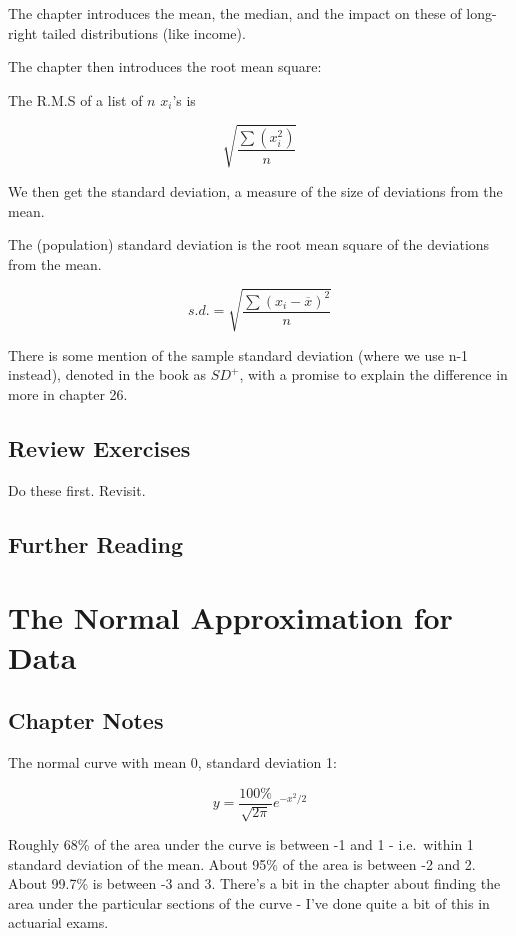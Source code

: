 \documentclass[
]{book}
\begin{document}
The chapter introduces the mean, the median, and the impact on these of long-right tailed distributions (like income).

The chapter then introduces the root mean square:

The R.M.S of a list of \(n\) \(x_i\)'s is

\[
\sqrt{\frac{\sum(x_i^2)}{n}}
\]

We then get the standard deviation, a measure of the size of deviations from the mean.

The (population) standard deviation is the root mean square of the deviations from the mean.

\[
s.d. = \sqrt{\frac{\sum(x_i - \overline{x})^2}{n}}
\]

There is some mention of the sample standard deviation (where we use n-1 instead), denoted in the book as \(SD^+\), with a promise to explain the difference in more in chapter 26.

\hypertarget{review-exercises-2}{%
\section{Review Exercises}\label{review-exercises-2}}

Do these first. Revisit.

\hypertarget{further-reading-3}{%
\section*{Further Reading}\label{further-reading-3}}

\hypertarget{normal_approx}{%
\chapter{The Normal Approximation for Data}\label{normal_approx}}

\hypertarget{chapter-notes-4}{%
\section{Chapter Notes}\label{chapter-notes-4}}

The normal curve with mean 0, standard deviation 1:

\[
y = \frac{100\%}{\sqrt{2\pi}}e^{-x^2/2}
\]

Roughly 68\% of the area under the curve is between -1 and 1 - i.e.~within 1 standard deviation of the mean. About 95\% of the area is between -2 and 2. About 99.7\% is between -3 and 3. There's a bit in the chapter about finding the area under the particular sections of the curve - I've done quite a bit of this in actuarial exams.
\end{document}
